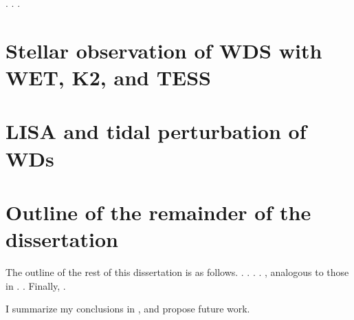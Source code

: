 \lipsum*[3][1]\citep{Peke38, Cox80}.
\lipsum*[3][2]\citep{UnnoETC79}.
\lipsum*[3][3]\citep{CorsBenv02}.

\section{Stellar observation of WDS with WET, K2, and TESS}

\lipsum[6]

\section{LISA and tidal perturbation of WDs}
\lipsum[5]


\section{Outline of the remainder of the dissertation}

\lipsum[9]

The outline of the rest of this dissertation is as follows.  
 \lipsum*[5][1-2].
 \lipsum*[5][3-4].
 \lipsum*[6][1-2].
 \lipsum*[6][4].
 \lipsum*[3][2], analogous to those in .  \lipsum*[5][3].
Finally,  .

I summarize my conclusions in , and propose future work.